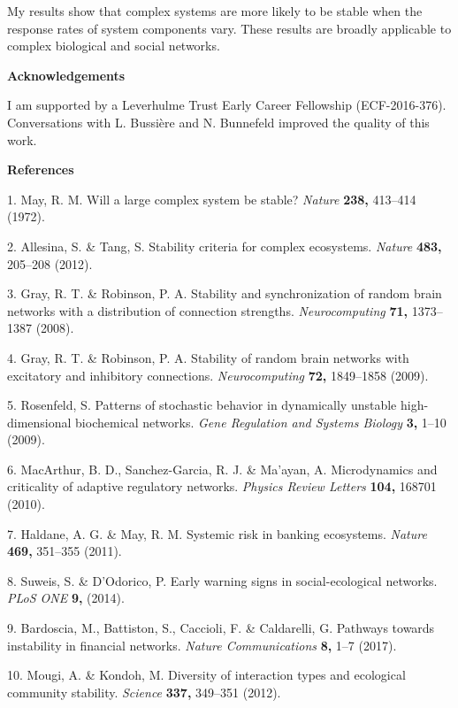 \documentclass[]{article}
\begin{document}
My results show that complex systems are more likely to be stable when
the response rates of system components vary. These results are broadly
applicable to complex biological and social networks.

\textbf{Acknowledgements}

I am supported by a Leverhulme Trust Early Career Fellowship (ECF-2016-376).
Conversations with L. Bussi\`ere and N. Bunnefeld improved the quality of
this work.

\textbf{References}

\hypertarget{refs}{}
\hypertarget{ref-May1972}{}
1. May, R. M. Will a large complex system be stable? \emph{Nature}
\textbf{238,} 413--414 (1972).

\hypertarget{ref-Allesina2012}{}
2. Allesina, S. \& Tang, S. Stability criteria for complex ecosystems.
\emph{Nature} \textbf{483,} 205--208 (2012).

\hypertarget{ref-Gray2008}{}
3. Gray, R. T. \& Robinson, P. A. Stability and synchronization of
random brain networks with a distribution of connection strengths.
\emph{Neurocomputing} \textbf{71,} 1373--1387 (2008).

\hypertarget{ref-Gray2009}{}
4. Gray, R. T. \& Robinson, P. A. Stability of random brain networks
with excitatory and inhibitory connections. \emph{Neurocomputing}
\textbf{72,} 1849--1858 (2009).

\hypertarget{ref-Rosenfeld2009}{}
5. Rosenfeld, S. Patterns of stochastic behavior in dynamically unstable
high-dimensional biochemical networks. \emph{Gene Regulation and Systems
Biology} \textbf{3,} 1--10 (2009).

\hypertarget{ref-MacArthur2010}{}
6. MacArthur, B. D., Sanchez-Garcia, R. J. \& Ma'ayan, A. Microdynamics
and criticality of adaptive regulatory networks. \emph{Physics Review
Letters} \textbf{104,} 168701 (2010).

\hypertarget{ref-Haldane2011}{}
7. Haldane, A. G. \& May, R. M. Systemic risk in banking ecosystems.
\emph{Nature} \textbf{469,} 351--355 (2011).

\hypertarget{ref-Suweis2014}{}
8. Suweis, S. \& D'Odorico, P. Early warning signs in social-ecological
networks. \emph{PLoS ONE} \textbf{9,} (2014).

\hypertarget{ref-Bardoscia2017}{}
9. Bardoscia, M., Battiston, S., Caccioli, F. \& Caldarelli, G. Pathways
towards instability in financial networks. \emph{Nature Communications}
\textbf{8,} 1--7 (2017).

\hypertarget{ref-Mougi2012}{}
10. Mougi, A. \& Kondoh, M. Diversity of interaction types and
ecological community stability. \emph{Science} \textbf{337,} 349--351
(2012).
\end{document}
